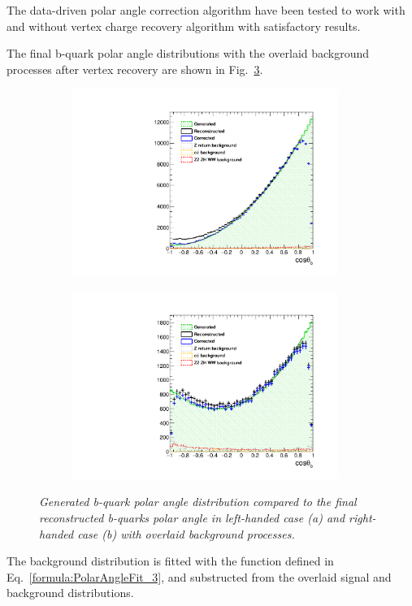 The data-driven polar angle correction algorithm have been tested to work with and without vertex charge recovery algorithm with satisfactory results. 

The final b-quark polar angle distributions with the overlaid background processes after vertex recovery are shown in Fig.~\ref{fig:BAsymmetryFinal_3}.
\begin{figure}
	\centering
	\begin{subfigure}{0.5\textwidth}
		\includegraphics[width=0.95\textwidth]{ILD/plots/basymmetry-final-left.pdf}
		\caption{\label{fig:BAsymmetryFinal_a_3} }
	\end{subfigure}%
	\begin{subfigure}{0.5\textwidth}
		\centering
		\includegraphics[width=0.95\textwidth]{ILD/plots/basymmetry-final-right.pdf}
		\caption{\label{fig:BAsymmetryFinal_b_3} }
	\end{subfigure}
	\caption{\sl Generated b-quark polar angle distribution compared to the final reconstructed b-quarks polar angle in left-handed case (a) and right-handed case (b) with overlaid background processes.  }
	\label{fig:BAsymmetryFinal_3}
\end{figure}
The background distribution is fitted with the function defined in Eq.~\ref{formula:PolarAngleFit_3}, and substructed from the overlaid signal and background distributions. 

